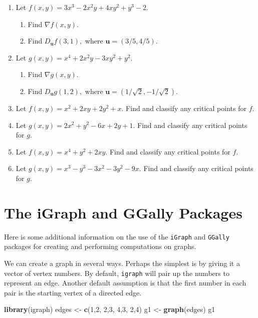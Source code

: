\documentclass[
]{book}
\newenvironment{Shaded}{\begin{snugshade}}{\end{snugshade}}
\newcommand{\DecValTok}[1]{\textcolor[rgb]{0.00,0.00,0.81}{#1}}
\newcommand{\FunctionTok}[1]{\textcolor[rgb]{0.13,0.29,0.53}{\textbf{#1}}}
\newcommand{\NormalTok}[1]{#1}
\newcommand{\OtherTok}[1]{\textcolor[rgb]{0.56,0.35,0.01}{#1}}
\providecommand{\tightlist}{%
  \setlength{\itemsep}{0pt}\setlength{\parskip}{0pt}}
\theoremstyle{definition}
\theoremstyle{definition}
\theoremstyle{definition}
\theoremstyle{definition}
\theoremstyle{remark}
\begin{document}
\begin{enumerate}
\def\labelenumi{\arabic{enumi}.}
\setcounter{enumi}{10}
\item
  Let \(f(x,y)=3x^3-2x^2y+4xy^2+y^3-2.\)

  \begin{enumerate}
  \def\labelenumii{\alph{enumii}.}
  \tightlist
  \item
    Find \(\nabla f(x,y).\)
  \item
    Find \(D_{\mathbf{u}}f(3,1),\) where \(\mathbf{u}=(3/5,4/5).\)
  \end{enumerate}
\item
  Let \(g(x,y)=x^4+2x^2y-3xy^2+y^2.\)

  \begin{enumerate}
  \def\labelenumii{\alph{enumii}.}
  \tightlist
  \item
    Find \(\nabla g(x,y).\)
  \item
    Find \(D_{\mathbf{u}}g(1,2),\) where \(\mathbf{u}=(1/\sqrt{2},-1/\sqrt{2}).\)
  \end{enumerate}
\item
  Let \(f(x,y)=x^2+2xy+2y^2+x\). Find and classify any critical points for \(f\).
\item
  Let \(g(x,y)=2x^2+y^2-6x+2y+1.\) Find and classify any critical points for \(g.\)
\item
  Let \(f(x,y)=x^4+y^2+2xy.\) Find and classify any critical points for \(f.\)
\item
  Let \(g(x,y)=x^3-y^3-3x^2-3y^2-9x.\) Find and classify any critical points for \(g.\)
\end{enumerate}

\chapter{The iGraph and GGally Packages}\label{the-igraph-and-ggally-packages}

Here is some additional information on the use of the \texttt{iGraph} and \texttt{GGally} packages for creating and performing computations on graphs.

We can create a graph in several ways. Perhaps the simplest is by giving it a vector of vertex numbers. By default, \texttt{igraph} will pair up the numbers to represent an edge. Another default assumption is that the first number in each pair is the starting vertex of a directed edge.

\begin{Shaded}
\begin{Highlighting}[]
\FunctionTok{library}\NormalTok{(igraph)}
\NormalTok{edges }\OtherTok{\textless{}{-}} \FunctionTok{c}\NormalTok{(}\DecValTok{1}\NormalTok{,}\DecValTok{2}\NormalTok{, }\DecValTok{2}\NormalTok{,}\DecValTok{3}\NormalTok{, }\DecValTok{4}\NormalTok{,}\DecValTok{3}\NormalTok{, }\DecValTok{2}\NormalTok{,}\DecValTok{4}\NormalTok{)}
\NormalTok{g1 }\OtherTok{\textless{}{-}} \FunctionTok{graph}\NormalTok{(edges)}
\NormalTok{g1}
\end{Highlighting}
\end{Shaded}
\end{document}
